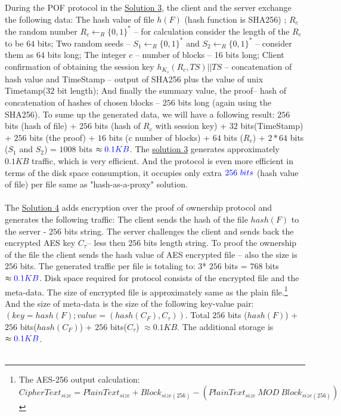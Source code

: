 \documentclass[12pt]{article}
\begin{document}
 During the POF protocol in the \hyperref[sub:Soltuion3]{Solution 3}, the client and the server  exchange the following data: The hash value of file $h(F)$ (hash function is SHA256) ; $R_c$ the random number $R_c \leftarrow _R \{0,1\}^*$ -- for calculation consider the length of the $R_c$ to be $64$ bits; Two random seeds -- $S_1 \leftarrow _R \{0,1\}^*$ and 
 $S_2 \leftarrow _R \{0,1\}^*$ -- consider them as $64$ bits long;  The integer $c$ -- number of blocks -- 16 bits long; Client confirmation of obtaining the session key $h_{K_s}(R_c,TS)||TS$ -- concatenation of hash value and TimeStamp -- output of SHA256 plus the value of unix Timetamp($32$ bit length); And finally the summary value, the proof-- hash of concatenation of hashes of chosen blocks -- $256$ bits long (again using the SHA256). To sume up the generated data, we will have a following result: $256$ bits (hash of file) + $256$ bits (hash of $R_c$ with session key) + $32$ bits(TimeStamp) + $256$ bits (the proof) + $16$ bits ($c$ number of blocks) + $64$ bits ($R_c$) + $2*64$ bits ($S_1$ and $S_2$) = $1008$ bits $\approx\color{blue} 0.1 KB$. The \hyperref[sub:Soltuion3]{solution 3} generates approximately $0.1 KB$ traffic, which is very efficient. And the protocol is even more efficient in terms of the disk space consumption, it occupies only extra $\color{blue}256\ bits$ (hash value of file) per file same as "hash-as-a-proxy" solution.\\\\
The \hyperref[sub:Soltuion4]{Solution 4} adds encryption over the proof of ownership protocol and generates the following traffic: The client sends the hash of the file $hash(F)$ to the server - $256$ bits string. The server challenges the client and sends back the encrypted AES key $C_\tau$-- less then $256$  bits length string. To proof the ownership of the file the client  sends the hash value of AES encrypted file -- also the size is $256$  bits. The generated traffic per file is totaling to: 3* $256$ bits = $768$ bits $\approx\color{blue}0.1KB$. Disk space required for protocol consists of the encrypted file and the meta-data. The size of encrypted file is approximately same as the plain file.\footnote{The AES-256 output calculation: $CipherText_{size} = PlainText_{size} + Block_{size(256)} - (PlainText_{size}\ MOD\ Block_{size(256)})$}  And the size of meta-data is the size of the following key-value pair: $(key = hash(F); value = (hash(C_F), C_\tau))$. Total  $256$ bits ($hash(F)$) + $256$ bits($hash(C_F)$) + $256$ bits($C_\tau$) $\approx0.1KB$. The additional storage is $\approx\color{blue}0.1KB$.\\\\
\end{document}
